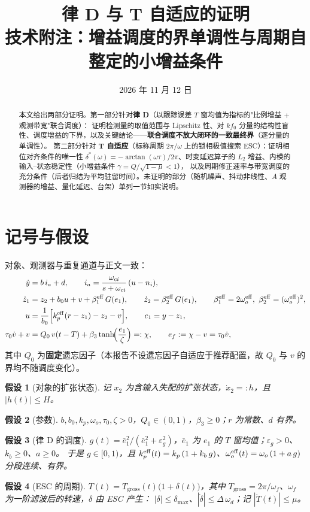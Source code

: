 \documentclass[11pt,a4paper]{article}
\title{\textbf{律 D 与 T 自适应的证明}\\[2mm]
\large 技术附注：增益调度的界单调性与周期自整定的小增益条件}
\author{}
\date{2026 年 11 月 12 日}
\newtheorem{assumption}{假设}
\theoremstyle{remark}
\newcommand{\ef}{e_f}
\newcommand{\st}{\operatorname{tanh}}
\newcommand{\Tg}{T_{\mathrm{gross}}}
\begin{document}
\maketitle

\begin{abstract}
\noindent 本文给出两部分证明。第一部分针对\textbf{律 D}（以跟踪误差 $T$ 窗均值为指标的"比例增益 $+$ 观测带宽"联合调度）：
证明检测量的取值范围与 Lipschitz 性、对 $k f_0$ 分量的结构性盲性、调度增益的下界，以及关键结论——\textbf{联合调度不放大闭环的一致最终界}（逐分量的单调性）。
第二部分针对 \textbf{T 自适应}（标称周期 $2\pi/\omega$ 上的锁相极值搜索 ESC）：证明相位对齐条件的唯一性
$\delta^{*}(\omega)=-\arctan(\omega\tau)/2\pi$、时变延迟算子的 $L_2$ 增益、内模的输入--状态稳定性（小增益条件 $\gamma=Q/\sqrt{1-\mu}<1$），
以及周期修正速率与带宽调度的充分条件（后者归结为平均驻留时间）。未证明的部分（随机噪声、抖动非线性、$A$ 观测器的增益、量化延迟、台架）单列一节如实说明。
\end{abstract}

\section{记号与假设}
对象、观测器与重复通道与正文一致：
\begin{align}
\dot y &= b\,i_a+d,\qquad i_a=\frac{\omega_{ci}}{s+\omega_{ci}}\,(u-n_i), \label{eq:plant}\\
\dot z_1 &= z_2+b_0u+v+\beta_1^{\rm eff}\,G(e_1),\qquad \dot z_2=\beta_2^{\rm eff}\,G(e_1),\qquad
\beta_1^{\rm eff}=2\omega_o^{\rm eff},\ \beta_2^{\rm eff}=(\omega_o^{\rm eff})^{2}, \label{eq:eso}\\
u&=\frac{1}{b_0}\Bigl[k_p^{\rm eff}(r-z_1)-z_2-v\Bigr],\qquad e_1=y-z_1, \label{eq:law}\\
\tau_0\dot v+v&=Q_0\,v(t-T)+\beta_3\st\!\Bigl(\frac{e_1}{\zeta}\Bigr)=:\chi,\qquad \ef:=\chi-v=\tau_0\dot v, \label{eq:rc}
\end{align}
其中 $Q_0$ 为\textbf{固定}遗忘因子（本报告不设遗忘因子自适应于推荐配置，故 $Q_0$ 与 $v$ 的界均不随调度变化）。

\begin{assumption}[对象的扩张状态]\label{as:h}
记 $x_2$ 为含输入失配的扩张状态，$\dot x_2=:h$，且 $|h(t)|\le H$。
\end{assumption}
\begin{assumption}[参数]\label{as:param}
$b,b_0,k_p,\omega_o,\tau_0,\zeta>0$，$Q_0\in(0,1)$，$\beta_3\ge0$；$r$ 为常数、$d$ 有界。
\end{assumption}
\begin{assumption}[律 D 的调度]\label{as:lawd}
$g(t)=\bar e_1^{2}/(\bar e_1^{2}+\varepsilon_g^{2})$，$\bar e_1$ 为 $e_1$ 的 $T$ 窗均值；$\varepsilon_g>0$、$k_b\ge0$、$a\ge0$。
于是 $g\in[0,1)$，且 $k_p^{\rm eff}(t)=k_p\,(1+k_b\,g)$、$\omega_o^{\rm eff}(t)=\omega_o\,(1+a\,g)$ 分段连续、有界。
\end{assumption}
\begin{assumption}[ESC 的周期]\label{as:esc}
$T(t)=\Tg(t)\bigl(1+\delta(t)\bigr)$，其中 $\Tg=2\pi/\omega_f$、$\omega_f$ 为一阶滤波后的转速，$\delta$ 由 ESC 产生：
$|\delta|\le\delta_{\max}$、$|\dot\delta|\le\Delta\,\omega_d$；记 $|\dot T(t)|\le\mu$。
\end{assumption}
\end{document}
